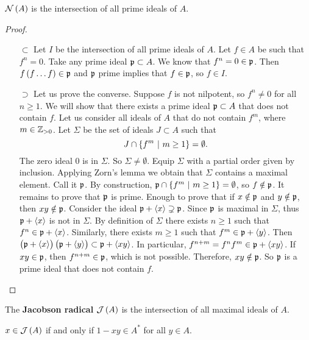\begin{proposition}
\label{prop:5.3}
$ \NNN\br{A} $ is the intersection of all prime ideals of $ A $.
\end{proposition}

\begin{proof}
\hfill
\begin{itemize}
\item[$ \subset $] Let $ I $ be the intersection of all prime ideals of $ A $. Let $ f \in A $ be such that $ f^n = 0 $. Take any prime ideal $ \mathfrak{p} \subset A $. We know that $ f^n = 0 \in \mathfrak{p} $. Then $ f\br{f \dots f} \in \ppp $ and $ \mathfrak{p} $ prime implies that $ f \in \mathfrak{p} $, so $ f \in I $.
\item[$ \supset $] Let us prove the converse. Suppose $ f $ is not nilpotent, so $ f^n \ne 0 $ for all $ n \ge 1 $. We will show that there exists a prime ideal $ \mathfrak{p} \subset A $ that does not contain $ f $. Let us consider all ideals of $ A $ that do not contain $ f^m $, where $ m \in \mathbb{Z}_{> 0} $. Let $ \Sigma $ be the set of ideals $ J \subset A $ such that
$$ J \cap \cbr{f^m \st m \ge 1} = \emptyset. $$
The zero ideal $ 0 $ is in $ \Sigma $. So $ \Sigma \ne \emptyset $. Equip $ \Sigma $ with a partial order given by inclusion. Applying Zorn's lemma we obtain that $ \Sigma $ contains a maximal element. Call it $ \mathfrak{p} $. By construction, $ \ppp \cap \cbr{f^m \st m \ge 1} = \emptyset $, so $ f \notin \mathfrak{p} $. It remains to prove that $ \mathfrak{p} $ is prime. Enough to prove that if $ x \notin \mathfrak{p} $ and $ y \notin \mathfrak{p} $, then $ xy \notin \mathfrak{p} $. Consider the ideal $ \mathfrak{p} + \left\langle x \right\rangle \supsetneq \mathfrak{p} $. Since $ \mathfrak{p} $ is maximal in $ \Sigma $, thus $ \mathfrak{p} + \left\langle x \right\rangle $ is not in $ \Sigma $. By definition of $ \Sigma $ there exists $ n \ge 1 $ such that $ f^n \in \mathfrak{p} + \left\langle x \right\rangle $. Similarly, there exists $ m \ge 1 $ such that $ f^m \in \mathfrak{p} + \left\langle y \right\rangle $. Then $ \br{\ppp + \abr{x}}\br{\ppp + \abr{y}} \subset \ppp + \abr{xy} $. In particular, $ f^{n + m} = f^nf^m \in \mathfrak{p} + \left\langle xy \right\rangle $. If $ xy \in \mathfrak{p} $, then $ f^{n + m} \in \mathfrak{p} $, which is not possible. Therefore, $ xy \notin \mathfrak{p} $. So $ \mathfrak{p} $ is a prime ideal that does not contain $ f $.
\end{itemize}
\end{proof}

\pagebreak

The \textbf{Jacobson radical} $ \JJJ\br{A} $ is the intersection of all maximal ideals of $ A $.

\begin{proposition}
$ x \in \JJJ\br{A} $ if and only if $ 1 - xy \in A^* $ for all $ y \in A $.
\end{proposition}

